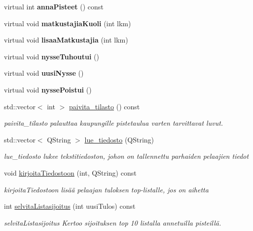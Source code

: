 \begin{DoxyCompactItemize}
\item 
\hypertarget{class_tilasto_ae9dc95097a968eec3e7ccf95802ca1ad}{virtual int {\bfseries anna\-Pisteet} () const }\label{class_tilasto_ae9dc95097a968eec3e7ccf95802ca1ad}

\item 
\hypertarget{class_tilasto_aee07b758b26e74787301d885134072cd}{virtual void {\bfseries matkustajia\-Kuoli} (int lkm)}\label{class_tilasto_aee07b758b26e74787301d885134072cd}

\item 
\hypertarget{class_tilasto_acc175adaef0890e7a619ffb647d1b712}{virtual void {\bfseries lisaa\-Matkustajia} (int lkm)}\label{class_tilasto_acc175adaef0890e7a619ffb647d1b712}

\item 
\hypertarget{class_tilasto_a9b424d80452e7c7e30e2ec3b2b67202c}{virtual void {\bfseries nysse\-Tuhoutui} ()}\label{class_tilasto_a9b424d80452e7c7e30e2ec3b2b67202c}

\item 
\hypertarget{class_tilasto_a02eeb0e7cadc5364bf6775923a538f28}{virtual void {\bfseries uusi\-Nysse} ()}\label{class_tilasto_a02eeb0e7cadc5364bf6775923a538f28}

\item 
\hypertarget{class_tilasto_ad1f3fdb38673138ef2472ada5a7a1400}{virtual void {\bfseries nysse\-Poistui} ()}\label{class_tilasto_ad1f3fdb38673138ef2472ada5a7a1400}

\item 
std\-::vector$<$ int $>$ \hyperlink{class_tilasto_a3d52332ec15d3cfb8a328ca5706ca7ab}{paivita\-\_\-tilasto} () const 
\begin{DoxyCompactList}\small\item\em paivita\-\_\-tilasto palauttaa kaupungille pistetaulua varten tarvittavat luvut. \end{DoxyCompactList}\item 
std\-::vector$<$ Q\-String $>$ \hyperlink{class_tilasto_a86702f1421079639ef7cd6d9a8c24019}{lue\-\_\-tiedosto} (Q\-String)
\begin{DoxyCompactList}\small\item\em lue\-\_\-tiedosto lukee tekstitiedoston, johon on tallennettu parhaiden pelaajien tiedot \end{DoxyCompactList}\item 
void \hyperlink{class_tilasto_a884916e254892439f8f4e8e3fa144566}{kirjoita\-Tiedostoon} (int, Q\-String) const 
\begin{DoxyCompactList}\small\item\em kirjoita\-Tiedostoon lisää pelaajan tuloksen top-\/listalle, jos on aihetta \end{DoxyCompactList}\item 
int \hyperlink{class_tilasto_a76f09fa3ec7ca9031b0143bcac01b882}{selvita\-Listasijoitus} (int uusi\-Tulos) const 
\begin{DoxyCompactList}\small\item\em selvita\-Listasijoitus Kertoo sijoituksen top 10 listalla annetuilla pisteillä. \end{DoxyCompactList}\end{DoxyCompactItemize}


